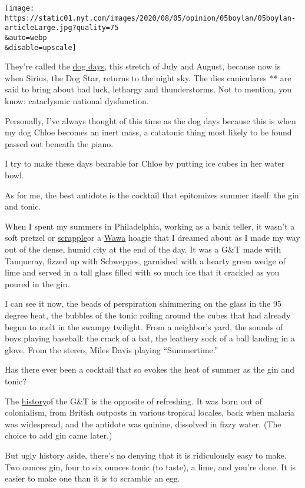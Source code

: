 \texttt{[image: https://static01.nyt.com/images/2020/08/05/opinion/05boylan/05boylan-articleLarge.jpg?quality=75\\\&auto=webp\\\&disable=upscale]}

They're called the
\href{https://www.almanac.com/content/what-are-dog-days-summer}{dog
days}, this stretch of July and August, because now is when Sirius, the
Dog Star, returns to the night sky. The dies caniculares ** are said to
bring about bad luck, lethargy and thunderstorms. Not to mention, you
know: cataclysmic national dysfunction.

Personally, I've always thought of this time as the dog days because
this is when my dog Chloe becomes an inert mass, a catatonic thing most
likely to be found passed out beneath the piano.

I try to make these days bearable for Chloe by putting ice cubes in her
water bowl.

As for me, the best antidote is the cocktail that epitomizes summer
itself: the gin and tonic.

When I spent my summers in Philadelphia, working as a bank teller, it
wasn't a soft pretzel or
\href{https://www.eater.com/2015/9/1/9211867/scrapple-goetta-livermush-what-is-it}{scrapple}or
a \href{https://mashable.com/2016/03/09/the-cult-of-wawa/}{Wawa} hoagie
that I dreamed about as I made my way out of the dense, humid city at
the end of the day. It was a G\&T made with Tanqueray, fizzed up with
Schweppes, garnished with a hearty green wedge of lime and served in a
tall glass filled with so much ice that it crackled as you poured in the
gin.

I can see it now, the beads of perspiration shimmering on the glass in
the 95 degree heat, the bubbles of the tonic roiling around the cubes
that had already begun to melt in the swampy twilight. From a neighbor's
yard, the sounds of boys playing baseball: the crack of a bat, the
leathery sock of a ball landing in a glove. From the stereo, Miles Davis
playing ``Summertime.''

Has there ever been a cocktail that so evokes the heat of summer as the
gin and tonic?

The
\href{https://www.kew.org/read-and-watch/just-the-tonic-history}{history}of
the G\&T is the opposite of refreshing. It was born out of colonialism,
from British outposts in various tropical locales, back when malaria was
widespread, and the antidote was quinine, dissolved in fizzy water. (The
choice to add gin came later.)

But ugly history aside, there's no denying that it is ridiculously easy
to make. Two ounces gin, four to six ounces tonic (to taste), a lime,
and you're done. It is easier to make one than it is to scramble an egg.


